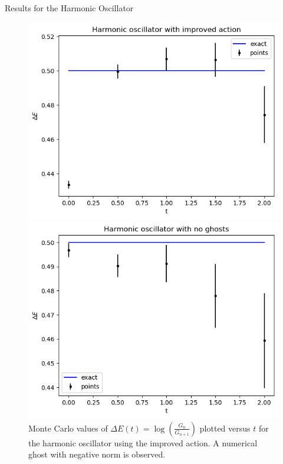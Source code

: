 \documentclass{beamer}
\begin{document}
\begin{frame}{Results for the Harmonic Oscillator}
    \begin{figure}[ht]
        \begin{minipage}[b]{0.4\linewidth}
            \centering
            \includegraphics[width=\textwidth]{Harmonic_oscillator_with_improved_action.png}
            \caption{Monte Carlo values of $\Delta E(t) = \log\left( \frac{G_n}{G_{n+1}} \right)$ plotted versus $t$ for the harmonic oscillator using the improved action. A numerical ghost with negative norm is observed.}
            \label{fig:Harmonic_oscillator_with_improved_action}
        \end{minipage}
        \hspace{0.5cm}
        \begin{minipage}[b]{0.4\linewidth}
            \centering
            \includegraphics[width=\textwidth]{harmonic_oscillator_with_no_ghosts.png}

\end{minipage}
\end{figure}
\end{frame}
\end{document}

